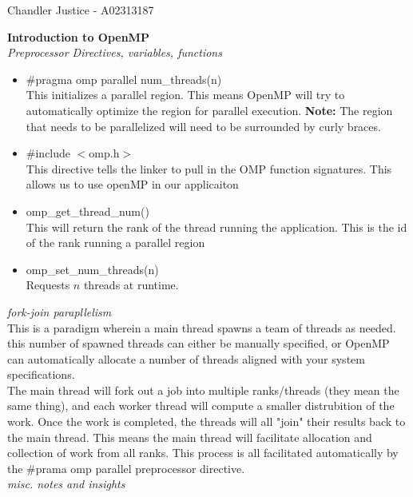 \documentclass[10pt, AMS Euler]{article}
\newcommand{\ds}{\displaystyle}
\begin{document}
\begin{flushright}
Chandler Justice - A02313187
\end{flushright}

\textbf{Introduction to OpenMP}\\

\ds\textit{Preprocessor Directives, variables, functions}\\

\begin{itemize}
  \item \#pragma omp parallel num\_threads(n)\\
    This initializes a parallel region. This means OpenMP will try to automatically optimize the region for parallel execution. \textbf{Note:} The region that needs to be parallelized will need to be surrounded by curly braces.
  \item \#include  $<$omp.h$>$\\ This directive tells the linker to pull in the OMP function signatures. This allows us to use openMP in our applicaiton
  \item omp\_get\_thread\_num()\\ This will return the rank of the thread running the application. This is the id of the rank running a parallel region
  \item omp\_set\_num\_threads(n)\\ Requests $n$ threads at runtime.

\end{itemize}

\textit{fork-join parapllelism}\\
This is a paradigm wherein a main thread spawns a team of threads as needed. this number of spawned threads can either be manually specified, or OpenMP can automatically allocate a number of threads aligned with your system specifications.\\

The main thread will fork out a job into multiple ranks/threads (they mean the same thing), and each worker thread will compute a smaller distrubition of the work. Once the work is completed, the threads will all "join" their results back to the main thread. This means the main thread will facilitate allocation and collection of work from all ranks. This process is all facilitated automatically by the \#prama omp parallel preprocessor directive. \\

\textit{misc. notes and insights}\\
\end{document}
